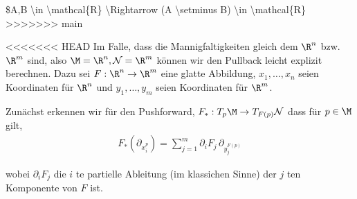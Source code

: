 \documentclass[letterpaper,10pt,english]{jupyterBook}
\begin{document}
\item {} 
\par
\$A,B \textbackslash{}in \textbackslash{}mathcal\{R\} \textbackslash{}Rightarrow (A \textbackslash{}setminus B) \textbackslash{}in \textbackslash{}mathcal\{R\}
>>>>>>> main

\item {} 
\par
<<<<<<< HEAD
Im Falle, dass die Mannigfaltigkeiten gleich dem \(\R^n\) bzw. \(\R^m\) sind, also \(\M=\R^n, \mathcal{N}=\R^m\) können wir den Pullback leicht explizit berechnen. Dazu sei \(F:\R^n\to\R^m\) eine glatte Abbildung, \(x_1,\ldots,x_n\) seien Koordinaten für \(\R^n\) und \(y_1,\ldots,y_m\) seien Koordinaten für \(\R^m\).

\par
Zunächst erkennen wir für den Pushforward, \(F_\ast:T_p\M\to T_{F(p)}\mathcal{N}\) dass für \(p\in\M\) gilt,
\begin{align*}
F_\ast(\partial_{x_i^p}) = \sum_{j=1}^m \partial_i F_j\, \partial_{y_j^{F(p)}}
\end{align*}
\par
wobei \(\partial_i F_j\) die \(i\) te partielle Ableitung (im klassichen Sinne) der \(j\) ten Komponente von \(F\) ist.
\end{document}
